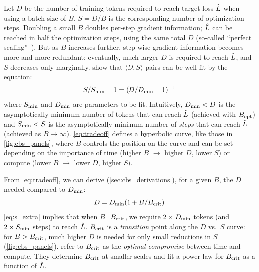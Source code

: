 Let $D$ be the number of training tokens required to reach target loss
$\hat{L}$ when using a batch size of $B$.  \mbox{$S = {D}/{B}$} is the
corresponding number of optimization steps.
%
Doubling a small $B$ doubles per-step gradient information; $\hat{L}$
can be reached in half the optimization steps, using the same total
$D$ (so-called ``perfect
scaling''~\citep{ma2018power,shallue2019measuring}).
%
But as $B$ increases further, step-wise gradient information becomes
more and more redundant: eventually, much larger $D$ is required to
reach $\hat{L}$, and $S$ decreases only marginally.
\citet{mccandlish2018empirical} show that $\langle D, S \rangle$ pairs
can be well fit by the equation:
%
\begin{equation}\label{eq:tradeoff}
S/S_{\text{min}} - 1 = (D/D_{\text{min}} - 1)^{-1}
\end{equation}
where $S_{\text{min}}$ and $D_{\text{min}}$ are parameters to be fit.  Intuitively,
$D_{\text{min}} < D$ is the asymptotically minimum number of tokens that can
reach $\hat{L}$ (achieved with $B_{\text{opt}}$) and $S_{\text{min}} < S$ is the
asymptotically minimum number of \emph{steps} that can reach $\hat{L}$
(achieved as $B \rightarrow \infty$).
\cref{eq:tradeoff} defines a hyperbolic curve, like those in
\cref{fig:cbs_panels}, where $B$ controls the position on the curve
and can be set depending on the importance of time (higher $B$
$\rightarrow$ higher $D$, lower $S$) or compute (lower $B$
$\rightarrow$ lower $D$, higher $S$).



From \cref{eq:tradeoff}, we can derive (\cref{sec:cbs_derivations}),
for a given $B$, the $D$ needed compared to $D_{\text{min}}$:
\begin{equation}\label{eq:s_extra}
D = D_{\text{min}}(1 + B/B_{\text{crit}})
\end{equation}
%
\cref{eq:s_extra} implies that when $B$=$B_{\text{crit}}$, we require
$2\times D_{\text{min}}$ tokens (and $2\times S_{\text{min}}$ steps) to reach $\hat{L}$.  $B_{\text{crit}}$ is a
\emph{transition} point along the $D$ vs.\ $S$ curve: for $B
> B_{\text{crit}}$, much higher $D$ is needed for only small reductions in $S$
(\cref{fig:cbs_panels}).
%
%
\citet{kaplan2020scaling} refer to $B_{\text{crit}}$ as the \emph{optimal compromise}
between time and compute.  They determine $B_{\text{crit}}$ at smaller scales and
fit a power law for $B_{\text{crit}}$ as a function of $\hat{L}$.

